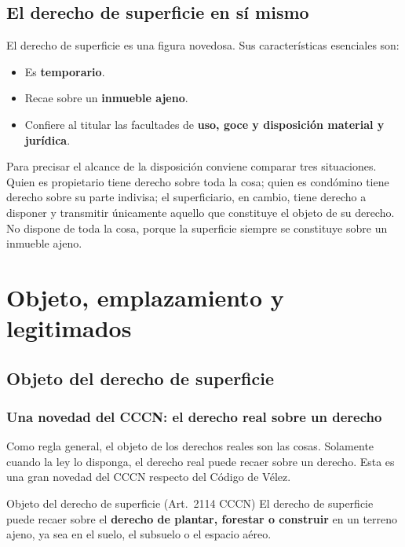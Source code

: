 \documentclass[12pt,oneside]{book}
\begin{document}
\section{El derecho de superficie en sí mismo}

El derecho de superficie es una figura novedosa. Sus características esenciales son:

\begin{itemize}
    \item Es \textbf{temporario}.
    \item Recae sobre un \textbf{inmueble ajeno}.
    \item Confiere al titular las facultades de \textbf{uso, goce y disposición material y jurídica}.
\end{itemize}

Para precisar el alcance de la disposición conviene comparar tres situaciones. Quien es propietario tiene derecho sobre toda la cosa; quien es condómino tiene derecho sobre su parte indivisa; el superficiario, en cambio, tiene derecho a disponer y transmitir únicamente aquello que constituye el objeto de su derecho. No dispone de toda la cosa, porque la superficie siempre se constituye sobre un inmueble ajeno.

\chapter[Objeto y emplazamiento]{Objeto, emplazamiento y legitimados}

\section{Objeto del derecho de superficie}

\subsection{Una novedad del CCCN: el derecho real sobre un derecho}

Como regla general, el objeto de los derechos reales son las cosas. Solamente cuando la ley lo disponga, el derecho real puede recaer sobre un derecho. Esta es una gran novedad del CCCN respecto del Código de Vélez.

\begin{definition}{Objeto del derecho de superficie (Art.~2114 CCCN)}
El derecho de superficie puede recaer sobre el \textbf{derecho de plantar, forestar o construir} en un terreno ajeno, ya sea en el suelo, el subsuelo o el espacio aéreo.
\end{definition}
\end{document}
